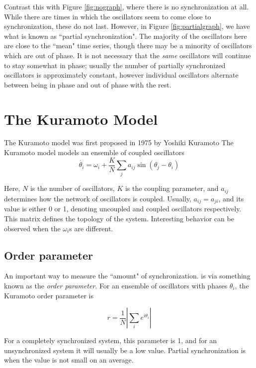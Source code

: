 \documentclass[12pt]{article}
\begin{document}
Contrast this with Figure \ref{fig:nograph}, where there is no synchronization at all. While there are times in which the oscillators seem to come close to synchronization, these do not last. However, in Figure \ref{fig:partialgraph}, we have what is known as ``partial synchronization". The majority of the oscillators here are close to the ``mean" time
 series, though there may be a minority of oscillators which are out of phase. It is not necessary that the \emph{same} oscillators will continue to stay somewhat in phase; usually the number of partially synchronized oscillators is approximately constant, however individual oscillators alternate between being in phase and out of phase with the rest.



\section{The Kuramoto Model}
The Kuramoto model was first proposed in 1975 by Yoshiki Kuramoto\cite{kuramoto1975proceedings}
The Kuramoto model models an ensemble of coupled oscillators
$$\dot{\theta_i} = \omega_i + \frac{K}{N}\sum_j a_{ij}\sin(\theta_j - \theta_i) $$

Here, $N$ is the number of oscillators, $K$ is the coupling parameter, and $a_{ij}$ determines how the network of oscillators is coupled. Usually, $a_{ij}=a_{ji}$, and its value is either 0 or 1, denoting uncoupled and coupled oscillators respectively. This matrix defines the topology of the system. Interesting behavior can be observed when the $\omega_i$s are different.

\subsection{Order parameter}
An important way to measure the ``amount" of synchronization. is via something known as the \emph{order parameter}. For an ensemble of oscillators with phases $\theta_i$, the Kuramoto order parameter is 

$$r = \frac1{N}\left|\sum_i e^{i\theta_i}\right|$$

For a completely synchronized system, this parameter is 1, and for an unsynchronized system it will usually be a low value. Partial synchronization is when the value is not small on an average.
\end{document}
